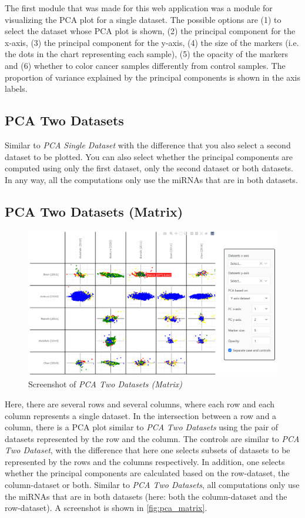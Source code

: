 {{{{{{{{{{{{{{{The first module that was made for this web application was a module for visualizing the PCA plot for a single dataset. The possible options are (1) to select the dataset whose PCA plot is shown, (2) the principal component for the x-axis, (3) the principal component for the y-axis, (4) the size of the markers (i.e. the dots in the chart representing each sample), (5) the opacity of the markers and (6) whether to color cancer samples differently from control samples. The proportion of variance explained by the principal components is shown in the axis labels.

\subsection{PCA Two Datasets}

Similar to \textit{PCA Single Dataset} with the difference that you also select a second dataset to be plotted. You can also select whether the principal components are computed using only the first dataset, only the second dataset or both datasets. In any way, all the computations only use the miRNAs that are in both datasets. 

\subsection{PCA Two Datasets (Matrix)}

\begin{figure}
    \centering
    \includegraphics[width=\textwidth]{figs/webapp_screenshots/pca_matrix.png}
    \caption{Screenshot of \textit{PCA Two Datasets (Matrix)}}
    \label{fig:pca_matrix}
\end{figure}

Here, there are several rows and several columns, where each row and each column represents a single dataset. In the intersection between a row and a column, there is a PCA plot similar to \textit{PCA Two Datasets} using the pair of datasets represented by the row and the column. The controls are similar to \textit{PCA Two Dataset}, with the difference that here one selects subsets of datasets to be represented by the rows and the columns respectively. In addition, one selects whether the principal components are calculated based on the row-dataset, the column-dataset or both. Similar to \textit{PCA Two Datasets}, all computations only use the miRNAs that are in both datasets (here: both the column-dataset and the row-dataset). A screenshot is shown in \autoref{fig:pca_matrix}.

}}}}}}}}}}}}}}}
